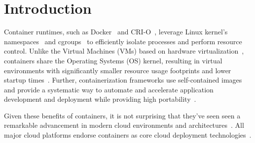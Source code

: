 \section{Introduction}
\label{sec:intro}

%
%
%
%
%
%
%


%

%
%
%
%
%
Container runtimes, such as Docker~\cite{docker} and \mbox{CRI-O}~\cite{cri-o},
leverage Linux kernel's namespaces~\cite{namespaces} and cgroups~\cite{cgroups}
to efficiently isolate processes and perform resource control.
%
Unlike the Virtual Machines (VMs) based on hardware
virtualization~\cite{adams2006comparison}, containers share the Operating
Systems (OS) kernel, resulting in virtual environments with significantly
smaller resource usage footprints and lower startup times~\cite{7819678}.
%
Further, containerization frameworks use self-contained images and provide a
systematic way to automate and accelerate application development and
deployment while providing high portability~\cite{docker}.
%

%
%
%
%
Given these benefits of containers, it is not surprising that they've seen seen
a remarkable advancement in modern cloud environments and
architectures~\cite{dockerbook}.
%
%
All major cloud platforms endorse containers as core cloud deployment
technologies~\cite{googlecengine,azurec,ibmkube,awscont}.

